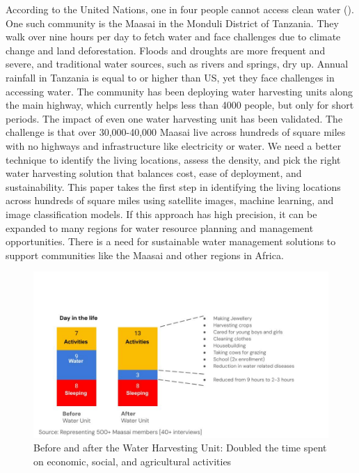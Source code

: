 \documentclass[10pt]{article}
\begin{document}
According to the United Nations, one in four people cannot access clean water (\autocite{United_Nations}). One such community is the Maasai in the Monduli District of Tanzania. They walk over nine hours per day to fetch water and face challenges due to climate change and land deforestation. Floods and droughts are more frequent and severe, and traditional water sources, such as rivers and springs, dry up. Annual rainfall in Tanzania is equal to or higher than US, yet they face challenges in accessing water. The community has been deploying water harvesting units along the main highway, which currently helps less than 4000 people, but only for short periods. The impact of even one water harvesting unit has been validated. The challenge is that over 30,000-40,000 Maasai live across hundreds of square miles with no highways and infrastructure like electricity or water. We need a better technique to identify the living locations, assess the density, and pick the right water harvesting solution that balances cost, ease of deployment, and sustainability. This paper takes the first step in identifying the living locations across hundreds of square miles using satellite images, machine learning, and image classification models. If this approach has high precision, it can be expanded to many regions for water resource planning and management opportunities.  There is a need for sustainable water management solutions to support communities like the Maasai and other regions in Africa.

\begin{figure} [H]
    \centering
    \includegraphics[width=1\linewidth]{images/beforeandafterwhu.jpg}
    \caption{Before and after the Water Harvesting Unit: Doubled the time spent on economic, social, and agricultural activities}
    \label{fig:bef_aft_results}
\end{figure}
\end{document}
